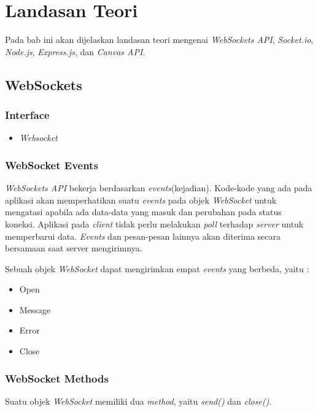 \chapter{Landasan Teori}
\label{chap:teori}

Pada bab ini akan dijelaskan landasan teori mengenai \textit{WebSockets API}, \textit{Socket.io}, \textit{Node.js}, \textit{Express.js}, dan \textit{Canvas API}.

\section{WebSockets}
\label{sec:WebSockets} 

\subsection{Interface}
	\begin{itemize}
		\item \textit{Websocket}
	\end{itemize}

\subsection{WebSocket Events}

\textit{WebSockets API} bekerja berdasarkan \textit{events}(kejadian). Kode-kode yang ada pada aplikasi akan memperhatikan suatu \textit{events} pada objek \textit{WebSocket} untuk mengatasi apabila ada data-data yang masuk dan perubahan pada status koneksi. Aplikasi pada \textit{client} tidak perlu melakukan \textit{poll} terhadap \textit{server} untuk memperbarui data. \textit{Events} dan pesan-pesan lainnya akan diterima secara bersamaan saat server mengirimnya.

Sebuah objek \textit{WebSocket} dapat mengirimkan empat \textit{events} yang berbeda, yaitu : 
	
	\begin{itemize}
		\item Open
		\item Message
		\item Error
		\item Close
	\end{itemize}

\subsection{WebSocket Methods}
Suatu objek \textit{WebSocket} memiliki dua \textit{method}, yaitu \textit{send()} dan \textit{close()}.

